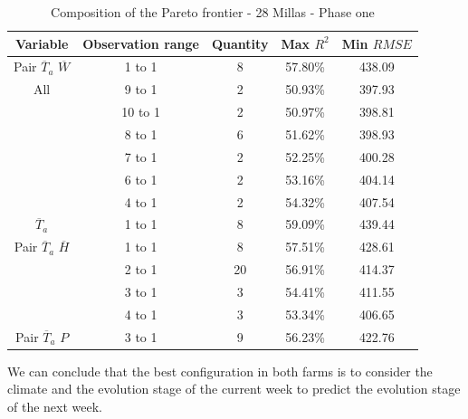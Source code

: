 \begin{table}[h] 
\caption{Composition of the Pareto frontier - 28 Millas - Phase one} 
\label{tabla4} 
\centering
\begin{tabular}{c|c|c|c|c} 
\hline
\bfseries Variable & \bfseries Observation range & \bfseries Quantity & \bfseries Max $R^2$ & \bfseries Min $RMSE$\\ 
\hline\hline 
Pair $\overline{T}_{a}$ $\overline{W}$ & 1 to 1 & 8 & 57.80\% & 438.09 \\
\hline 
All   &	9 to 1 & 2 & 50.93\% & 397.93 \\
  & 10 to 1	 & 2 & 50.97\% & 398.81 \\
  &	8 to 1 & 6 & 51.62\% & 398.93 \\
  &	7 to 1 & 2 & 52.25\% & 400.28 \\
  &	6 to 1 & 2 & 53.16\% & 404.14 \\
  &	4 to 1 & 2 & 54.32\% & 407.54 \\
\hline    
$\overline{T}_{a}$ & 1 to 1  & 8  & 59.09\% & 439.44 \\
\hline
Pair $\overline{T}_{a}$ $\overline{H}$ & 1 to 1	 & 8 & 57.51\% & 428.61 \\
 &	2 to 1 & 20 & 56.91\% & 414.37 \\
 &	3 to 1 & 3 & 54.41\% & 411.55 \\
 &	4 to 1 & 3 & 53.34\% & 406.65 \\
\hline
Pair $\overline{T}_{a}$ $P$ & 3 to 1 & 9 & 56.23\% & 422.76 \\
\hline
\end{tabular} 
\end{table}

We can conclude that the best configuration in both farms is to consider the climate and the evolution stage of the current week to predict the evolution stage of the next week.


